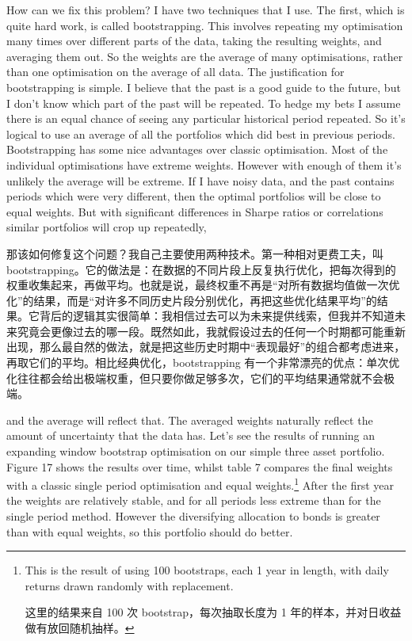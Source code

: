 
\begin{englishblock} How can we fix this problem? I have two techniques that I use. The first, which is quite hard work, is called bootstrapping. This involves repeating my optimisation many times over different parts of the data, taking the resulting weights, and averaging them out. So the weights are the average of many optimisations, rather than one optimisation on the average of all data. The justification for bootstrapping is simple. I believe that the past is a good guide to the future, but I don't know which part of the past will be repeated. To hedge my bets I assume there is an equal chance of seeing any particular historical period repeated. So it's logical to use an average of all the portfolios which did best in previous periods. Bootstrapping has some nice advantages over classic optimisation. Most of the individual optimisations have extreme weights. However with enough of them it's unlikely the average will be extreme. If I have noisy data, and the past contains periods which were very different, then the optimal portfolios will be close to equal weights. But with significant differences in Sharpe ratios or correlations similar portfolios will crop up repeatedly, \end{englishblock}

\begin{chineseblock}那该如何修复这个问题？我自己主要使用两种技术。第一种相对更费工夫，叫 bootstrapping。它的做法是：在数据的不同片段上反复执行优化，把每次得到的权重收集起来，再做平均。也就是说，最终权重不再是“对所有数据均值做一次优化”的结果，而是“对许多不同历史片段分别优化，再把这些优化结果平均”的结果。它背后的逻辑其实很简单：我相信过去可以为未来提供线索，但我并不知道未来究竟会更像过去的哪一段。既然如此，我就假设过去的任何一个时期都可能重新出现，那么最自然的做法，就是把这些历史时期中“表现最好”的组合都考虑进来，再取它们的平均。相比经典优化，bootstrapping 有一个非常漂亮的优点：单次优化往往都会给出极端权重，但只要你做足够多次，它们的平均结果通常就不会极端。\end{chineseblock}

\bipairgap

\begin{englishblock} and the average will reflect that. The averaged weights naturally reflect the amount of uncertainty that the data has. Let's see the results of running an expanding window bootstrap optimisation on our simple three asset portfolio. Figure 17 shows the results over time, whilst table 7 compares the final weights with a classic single period optimisation and equal weights.\footnote{This is the result of using 100 bootstraps, each 1 year in length, with daily returns drawn randomly with replacement. \par 这里的结果来自 100 次 bootstrap，每次抽取长度为 1 年的样本，并对日收益做有放回随机抽样。} After the first year the weights are relatively stable, and for all periods less extreme than for the single period method. However the diversifying allocation to bonds is greater than with equal weights, so this portfolio should do better. \end{englishblock}

